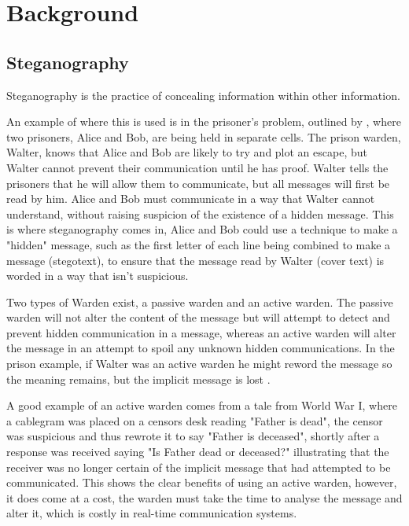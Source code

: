 \chapter{Background}
\label{ch:background}

\section{Steganography}

Steganography is the practice of concealing information within other information.

An example of where this is used is in the prisoner's problem, outlined by \cite{SIMMONS}, where two prisoners, Alice and Bob, are being held in separate cells. The prison warden, Walter, knows that Alice and Bob are likely to try and plot an escape, but Walter cannot prevent their communication until he has proof. Walter tells the prisoners that he will allow them to communicate, but all messages will first be read by him. Alice and Bob must communicate in a way that Walter cannot understand, without raising suspicion of the existence of a hidden message. This is where steganography comes in, Alice and Bob could use a technique to make a "hidden" message, such as the first letter of each line being combined to make a message (stegotext), to ensure that the message read by Walter (cover text) is worded in a way that isn't suspicious.

Two types of Warden exist, a passive warden and an active warden. The passive warden will not alter the content of the message but will attempt to detect and prevent hidden communication in a message, whereas an active warden will alter the message in an attempt to spoil any unknown hidden communications. In the prison example, if Walter was an active warden he might reword the message so the meaning remains, but the implicit message is lost \citep{aSoCaSaAWA}.

A good example of an active warden comes from a tale from World War I, where a cablegram was placed on a censors desk reading "Father is dead", the censor was suspicious and thus rewrote it to say "Father is deceased", shortly after a response was received saying "Is Father dead or deceased?" \citep{TCTSoSW} illustrating that the receiver was no longer certain of the implicit message that had attempted to be communicated. This shows the clear benefits of using an active warden, however, it does come at a cost, the warden must take the time to analyse the message and alter it, which is costly in real-time communication systems.

